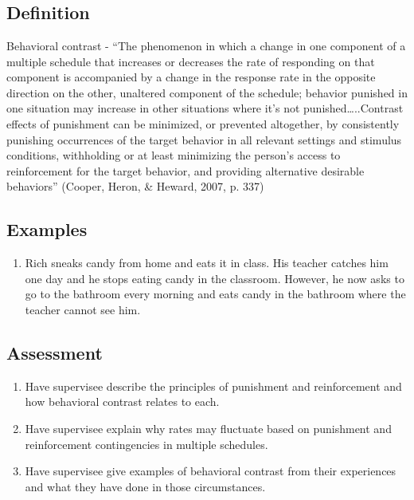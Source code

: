 \section{\fourFKThirtyEight{}}
\subsection{Definition} 
Behavioral contrast - ``The  phenomenon in which a change in one component of a multiple schedule that increases or decreases the rate of responding on that component is accompanied by a change in the response rate in the opposite direction on the other, unaltered component of the schedule; behavior punished in one situation may increase in other situations where it's not punished…..Contrast effects of punishment can be minimized, or prevented altogether, by consistently punishing occurrences of the target behavior in all relevant settings and stimulus conditions, withholding or at least minimizing the person's access to reinforcement for the target behavior, and providing alternative desirable behaviors'' (Cooper, Heron, \& Heward, 2007, p. 337)
%
\subsection{Examples}
\begin{enumerate}
\item Rich sneaks candy from home and eats it in class. His teacher catches him one day and he stops eating candy in the classroom. However, he now asks to go to the bathroom every morning and eats candy in the bathroom where the teacher cannot see him. 
%
\end{enumerate}
%
\subsection{Assessment}
\begin{enumerate}
\item Have supervisee describe the principles of punishment and reinforcement and how behavioral contrast relates to each.
\item Have supervisee explain why rates may fluctuate based on punishment and reinforcement contingencies in multiple schedules.
\item Have supervisee give examples of behavioral contrast from their experiences and what they have done in those circumstances.
%
\end{enumerate}
%
